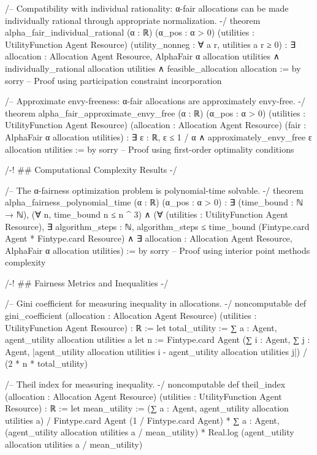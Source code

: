 /--
Compatibility with individual rationality: α-fair allocations can be made
individually rational through appropriate normalization.
-/
theorem alpha_fair_individual_rational (α : ℝ) (α_pos : α > 0)
    (utilities : UtilityFunction Agent Resource)
    (utility_nonneg : ∀ a r, utilities a r ≥ 0) :
    ∃ allocation : Allocation Agent Resource,
      AlphaFair α allocation utilities ∧
      individually_rational allocation utilities ∧
      feasible_allocation allocation := by
  sorry -- Proof using participation constraint incorporation

/--
Approximate envy-freeness: α-fair allocations are approximately envy-free.
-/
theorem alpha_fair_approximate_envy_free (α : ℝ) (α_pos : α > 0)
    (utilities : UtilityFunction Agent Resource)
    (allocation : Allocation Agent Resource)
    (fair : AlphaFair α allocation utilities) :
    ∃ ε : ℝ, ε ≤ 1 / α ∧ 
    approximately_envy_free ε allocation utilities := by
  sorry -- Proof using first-order optimality conditions

/-! ## Computational Complexity Results -/

/--
The α-fairness optimization problem is polynomial-time solvable.
-/
theorem alpha_fairness_polynomial_time (α : ℝ) (α_pos : α > 0) :
    ∃ (time_bound : ℕ → ℕ),
      (∀ n, time_bound n ≤ n ^ 3) ∧
      (∀ (utilities : UtilityFunction Agent Resource),
         ∃ algorithm_steps : ℕ,
           algorithm_steps ≤ time_bound (Fintype.card Agent * Fintype.card Resource) ∧
           ∃ allocation : Allocation Agent Resource,
             AlphaFair α allocation utilities) := by
  sorry -- Proof using interior point methods complexity

/-! ## Fairness Metrics and Inequalities -/

/--
Gini coefficient for measuring inequality in allocations.
-/
noncomputable def gini_coefficient (allocation : Allocation Agent Resource)
    (utilities : UtilityFunction Agent Resource) : ℝ :=
  let total_utility := ∑ a : Agent, agent_utility allocation utilities a
  let n := Fintype.card Agent
  (∑ i : Agent, ∑ j : Agent, 
    |agent_utility allocation utilities i - agent_utility allocation utilities j|) /
  (2 * n * total_utility)

/--
Theil index for measuring inequality.
-/
noncomputable def theil_index (allocation : Allocation Agent Resource)
    (utilities : UtilityFunction Agent Resource) : ℝ :=
  let mean_utility := (∑ a : Agent, agent_utility allocation utilities a) / Fintype.card Agent
  (1 / Fintype.card Agent) * 
  ∑ a : Agent, (agent_utility allocation utilities a / mean_utility) * 
                Real.log (agent_utility allocation utilities a / mean_utility)

